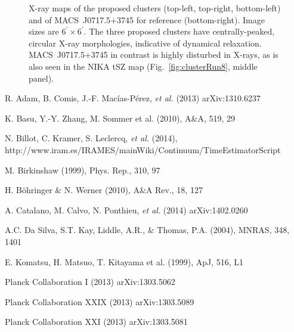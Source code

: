 \documentclass[11pt,a4paper,twoside,graphicx,color]{article}
\begin{document}
{\begin{figure}[h]
\caption{\footnotesize X-ray maps of the proposed clusters (top-left, top-right, bottom-left) and of MACS~J0717.5+3745 for reference (bottom-right). Image sizes are $6^\prime \times 6^\prime$. The three proposed clusters have centrally-peaked, circular X-ray morphologies, indicative of dynamical relaxation. MACS~J0717.5+3745 in contrast is highly disturbed in X-rays, as is also seen in the NIKA tSZ map (Fig.~\ref{fig:clusterRun8}, middle panel).}
\label{fig:xray}
\end{figure}


\begin{thebibliography}{9}

R. Adam, B. Comis, J.-F. Mac\'ias-P\'erez, {\it et al.} (2013) arXiv:1310.6237
  
  	K. Basu, Y.-Y. Zhang, M. Sommer et al. (2010), A\&A, 519, 29
  
N. Billot, C. Kramer, S. Leclercq, {\it et al.} (2014), \\ http://www.iram.es/IRAMES/mainWiki/Continuum/TimeEstimatorScript

M. Birkinshaw (1999), Phys. Rep., 310, 97

H. B\"{o}hringer \& N. Werner (2010), A\&A Rev., 18, 127

A. Catalano, M. Calvo, N. Ponthieu, {\it et al.} (2014) arXiv:1402.0260
  
  A.C. Da Silva, S.T. Kay, Liddle, A.R., \& Thomas, P.A. (2004), MNRAS, 348, 1401
  
  	E. Komatsu, H. Matsuo, T. Kitayama et al. (1999), ApJ, 516, L1
  
Planck Collaboration I (2013) arXiv:1303.5062 

Planck Collaboration XXIX (2013) arXiv:1303.5089 

Planck Collaboration XXI (2013) arXiv:1303.5081


\end{thebibliography}}
\end{document}
